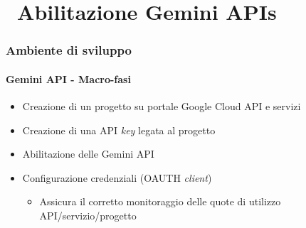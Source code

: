 \section{\faWrench\ Abilitazione Gemini APIs} %
\label{sec:diy-gemini-apis}
%
\begin{frame}[t,fragile] \frametitle{Ambiente di sviluppo}
\framesubtitle{Gemini API - Macro-fasi}
    \begin{itemize}
        \item[\alertedcircled{1}] Creazione di un progetto su portale Google Cloud API e servizi
        \item[\alertedcircled{2}] Creazione di una API \textit{key} legata al progetto
        \item[\alertedcircled{3}] Abilitazione delle Gemini API
        \item[\alertedcircled{4}] Configurazione credenziali (OAUTH \textit{client})
        \begin{itemize}[leftmargin=20pt,align=right]
			\item[\alert{\faHandORight}] Assicura il corretto monitoraggio delle quote di utilizzo API/servizio/progetto
        \end{itemize}
    \end{itemize}
\end{frame}
%
